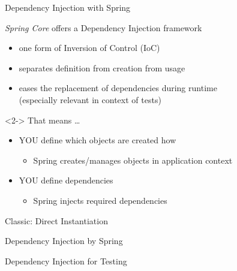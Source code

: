 \begin{frame}{Dependency Injection with Spring}
\begin{block}{\emph{Spring Core} offers a Dependency Injection framework}
\begin{itemize}
\item one form of Inversion of Control (IoC)
\item separates definition from creation from usage
\item eases the replacement of dependencies during runtime\\(especially relevant in context of tests)
\end{itemize}
\end{block}
\vfill
\begin{visibleenv}<2->
That means \ldots
\begin{itemize}
\item YOU define which objects are created how
	\begin{itemize}
	\item Spring creates/manages objects in application context
	\end{itemize}
\item YOU define dependencies
	\begin{itemize}
	\item Spring injects required dependencies
	\end{itemize}
\end{itemize}
\end{visibleenv}
\end{frame}


\begin{frame}[fragile]{Classic: Direct Instantiation}
\begin{figure}
\end{figure}
\end{frame}

\begin{frame}[fragile]{Dependency Injection by Spring}
\begin{figure}
\end{figure}
\end{frame}

\begin{frame}[fragile]{Dependency Injection for Testing}
\begin{figure}
\end{figure}
\end{frame}


